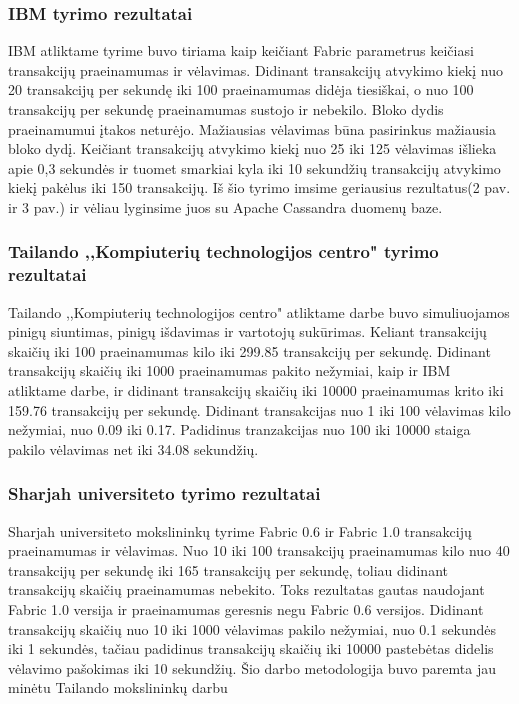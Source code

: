 \documentclass{VUMIFPSkursinis}
\begin{document}
\subsubsection{IBM tyrimo rezultatai}
IBM atliktame tyrime \cite{IMBResearch} buvo tiriama kaip keičiant Fabric parametrus keičiasi transakcijų praeinamumas ir vėlavimas. Didinant transakcijų atvykimo kiekį nuo 20 transakcijų per sekundę iki 100 praeinamumas didėja tiesiškai, o nuo 100 transakcijų per sekundę praeinamumas sustojo ir nebekilo. Bloko dydis praeinamumui įtakos neturėjo. 
\newline
Mažiausias vėlavimas būna pasirinkus mažiausia bloko dydį. Keičiant transakcijų atvykimo kiekį nuo 25 iki 125 vėlavimas išlieka apie 0,3 sekundės ir tuomet smarkiai kyla iki 10 sekundžių transakcijų 
atvykimo kiekį pakėlus iki 150 transakcijų. 
\newline
Iš šio tyrimo imsime geriausius rezultatus(2 pav. ir 3 pav.) ir vėliau lyginsime juos su Apache Cassandra duomenų baze. 
\subsubsection{Tailando ,,Kompiuterių technologijos centro" tyrimo rezultatai}
Tailando ,,Kompiuterių technologijos centro" atliktame darbe \cite{ThailandPerf} buvo simuliuojamos pinigų siuntimas, pinigų išdavimas ir vartotojų sukūrimas. Keliant transakcijų skaičių iki 100 praeinamumas kilo iki 299.85 transakcijų per sekundę. Didinant transakcijų skaičių iki 1000 praeinamumas pakito nežymiai, kaip ir IBM \cite{IMBResearch} atliktame darbe, ir didinant transakcijų skaičių iki 10000 praeinamumas krito iki 159.76 transakcijų per sekundę. 
Didinant transakcijas nuo 1 iki 100 vėlavimas kilo nežymiai, nuo 0.09 iki 0.17. Padidinus tranzakcijas nuo 100 iki 10000 staiga pakilo vėlavimas net iki 34.08 sekundžių.
\subsubsection{Sharjah universiteto tyrimo rezultatai}
Sharjah universiteto mokslininkų tyrime \cite{ShaFabPerf} Fabric 0.6 ir Fabric 1.0 transakcijų praeinamumas ir vėlavimas. Nuo 10 iki 100 transakcijų praeinamumas kilo nuo 40 transakcijų per sekundę iki 165 transakcijų per sekundę, toliau didinant transakcijų skaičių praeinamumas nebekito. Toks rezultatas gautas naudojant Fabric 1.0 versija ir praeinamumas geresnis negu Fabric 0.6 versijos. 
Didinant transakcijų skaičių nuo 10 iki 1000 vėlavimas pakilo nežymiai, nuo 0.1 sekundės iki 1 sekundės, tačiau padidinus transakcijų skaičių iki 10000 pastebėtas didelis vėlavimo pašokimas iki 10 sekundžių. Šio darbo metodologija buvo paremta jau minėtu Tailando mokslininkų darbu \cite{ThailandPerf}
\end{document}
